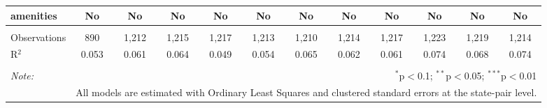 \begin{table}[!htbp]
\begin{tabular}{@{\extracolsep{5pt}}lccccccccccc}
amenities & No & No & No & No & No & No & No & No & No & No & No \\ 
\hline \\[-1.8ex] 
Observations & 890 & 1,212 & 1,215 & 1,217 & 1,213 & 1,210 & 1,214 & 1,217 & 1,223 & 1,219 & 1,214 \\ 
R$^{2}$ & 0.053 & 0.061 & 0.064 & 0.049 & 0.054 & 0.065 & 0.062 & 0.061 & 0.074 & 0.068 & 0.074 \\ 
\hline 
\hline \\[-1.8ex] 
\textit{Note:}  & \multicolumn{11}{r}{$^{*}$p$<$0.1; $^{**}$p$<$0.05; $^{***}$p$<$0.01} \\ 
 & \multicolumn{11}{r}{All models are estimated with Ordinary Least Squares and clustered standard errors at the state-pair level.} \\ 
\end{tabular} 
\end{table} 
